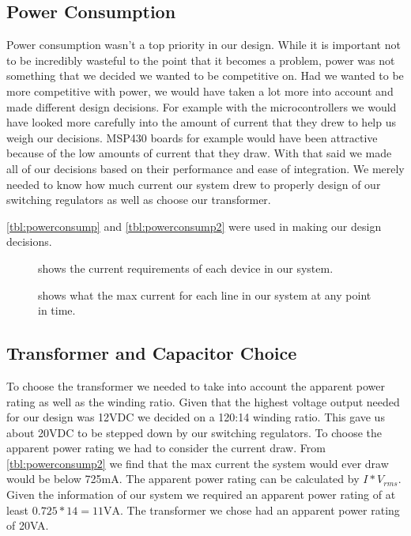 \documentclass[draft,twocolumn,letterpaper,10pt]{IEEEtran}
\newcommand{\ucffig}[3]{
\begin{figure}[h]
\centering
\makebox[\linewidth][c]{
#2
}
\caption{#3}
\label{#1}
\end{figure}
}
\newcommand{\ucfgfx}[4][scale=1.0]{
\ucffig{#2}{\texttt{[image: \#3]}}{#4}
}
\begin{document}

\subsection{Power Consumption}
\label{sec:power-consumption}
Power consumption wasn{}'t a top priority in our design. While it is important
not to be incredibly wasteful to the point that it becomes a problem, power was
not something that we decided we wanted to be competitive on. Had we wanted to
be more competitive with power, we would have taken a lot more into account and
made different design decisions. For example with the microcontrollers we would
have looked more carefully into the amount of current that they drew to help us
weigh our decisions. MSP430 boards for example would have been attractive
because of the low amounts of current that they draw. With that said we made
all of our decisions based on their performance and ease of integration. We
merely needed to know how much current our system drew to properly design of
our switching regulators as well as choose our transformer.

\autoref{tbl:powerconsump} and \autoref{tbl:powerconsump2} were used in making our design decisions.

\ucfgfx[width=0.8\linewidth]{tbl:powerconsump}{Powerconsump-img001.png}{shows the current requirements of each device in our system.}

\ucfgfx[width=0.54\linewidth]{tbl:powerconsump2}{Powerconsump-img002.png}{shows what the max current for each line in our system at any point in time.}

\subsection{Transformer and Capacitor Choice}
To choose the transformer we needed to take into account the apparent power
rating as well as the winding ratio. Given that the highest voltage output
needed for our design was 12VDC we decided on a 120:14 winding ratio. This gave
us about 20VDC to be stepped down by our switching regulators. To choose the
apparent power rating we had to consider the current draw. From
\autoref{tbl:powerconsump2} we find that the max current the system would ever
draw would be below 725mA. The apparent power rating can be calculated by
$I*V_{rms}$. Given the information of our system we required an apparent power
rating of at least $0.725*14 = 11\text{VA}$. The transformer we chose had an apparent power
rating of 20VA. 
\end{document}

